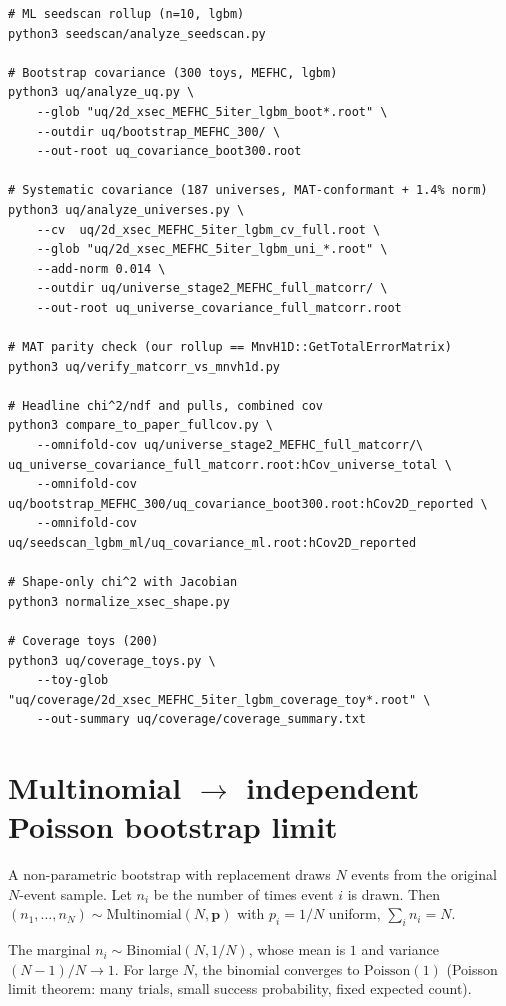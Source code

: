 \documentclass[12pt]{article}
\begin{document}
\begin{small}
\begin{verbatim}
# ML seedscan rollup (n=10, lgbm)
python3 seedscan/analyze_seedscan.py

# Bootstrap covariance (300 toys, MEFHC, lgbm)
python3 uq/analyze_uq.py \
    --glob "uq/2d_xsec_MEFHC_5iter_lgbm_boot*.root" \
    --outdir uq/bootstrap_MEFHC_300/ \
    --out-root uq_covariance_boot300.root

# Systematic covariance (187 universes, MAT-conformant + 1.4% norm)
python3 uq/analyze_universes.py \
    --cv  uq/2d_xsec_MEFHC_5iter_lgbm_cv_full.root \
    --glob "uq/2d_xsec_MEFHC_5iter_lgbm_uni_*.root" \
    --add-norm 0.014 \
    --outdir uq/universe_stage2_MEFHC_full_matcorr/ \
    --out-root uq_universe_covariance_full_matcorr.root

# MAT parity check (our rollup == MnvH1D::GetTotalErrorMatrix)
python3 uq/verify_matcorr_vs_mnvh1d.py

# Headline chi^2/ndf and pulls, combined cov
python3 compare_to_paper_fullcov.py \
    --omnifold-cov uq/universe_stage2_MEFHC_full_matcorr/\
uq_universe_covariance_full_matcorr.root:hCov_universe_total \
    --omnifold-cov uq/bootstrap_MEFHC_300/uq_covariance_boot300.root:hCov2D_reported \
    --omnifold-cov uq/seedscan_lgbm_ml/uq_covariance_ml.root:hCov2D_reported

# Shape-only chi^2 with Jacobian
python3 normalize_xsec_shape.py

# Coverage toys (200)
python3 uq/coverage_toys.py \
    --toy-glob "uq/coverage/2d_xsec_MEFHC_5iter_lgbm_coverage_toy*.root" \
    --out-summary uq/coverage/coverage_summary.txt
\end{verbatim}
\end{small}

\section{Multinomial $\to$ independent Poisson bootstrap limit}
\label{app:poisson}

A non-parametric bootstrap with replacement draws $N$ events from the
original $N$-event sample. Let $n_{i}$ be the number of times event
$i$ is drawn. Then $(n_{1},\dots,n_{N}) \sim \mathrm{Multinomial}(N,
\mathbf{p})$ with $p_{i}=1/N$ uniform, $\sum_{i}n_{i}=N$.

The marginal $n_{i}\sim\mathrm{Binomial}(N,1/N)$, whose mean is $1$
and variance $(N-1)/N \to 1$. For large $N$, the binomial converges to
$\mathrm{Poisson}(1)$ (Poisson limit theorem: many trials, small
success probability, fixed expected count).
\end{document}
